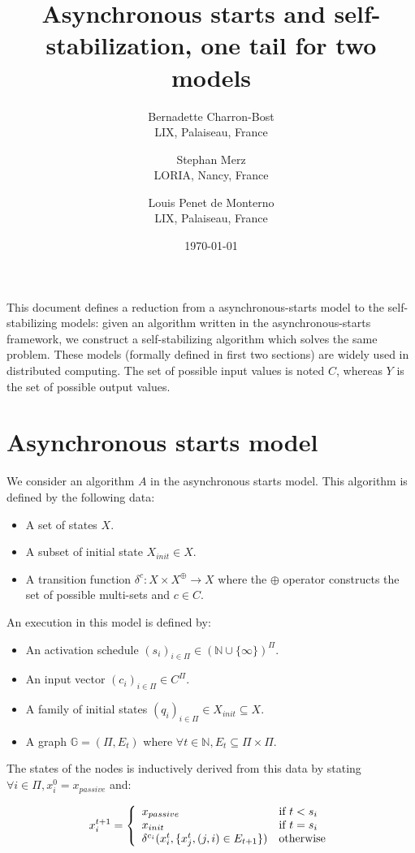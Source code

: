 \documentclass[11pt,letterpaper]{article}
\title{Asynchronous starts and self-stabilization, one tail for two models}
\author{
	Bernadette Charron-Bost \\
	LIX, Palaiseau, France
\and
	Stephan Merz \\
	LORIA, Nancy, France
\and
	Louis Penet de Monterno \\
	LIX, Palaiseau, France
}
\date{\today}
\begin{document}
  \maketitle

This document defines a reduction from a asynchronous-starts model to the self-stabilizing models:
given an algorithm written in the asynchronous-starts framework, we construct a self-stabilizing algorithm which solves the same problem.
These models (formally defined in first two sections) are widely used in distributed computing.
The set of possible input values is noted $C$, whereas $Y$ is the set of possible output values.

\section{Asynchronous starts model}

We consider an algorithm $A$ in the asynchronous starts model.
This algorithm is defined by the following data:

\begin{itemize}
	\item A set of states $X$.
	\item A subset of initial state $X_{init} \in X$.
	\item A transition function $\delta^c : X \times X^\oplus \rightarrow X$ where the $\oplus$ operator constructs the set of possible multi-sets and $c \in C$.
\end{itemize}

\noindent An execution in this model is defined by:
\begin{itemize}
	\item An activation schedule $(s_i)_{i \in \Pi} \in (\mathds{N} \cup \{\infty\})^\Pi$.
	\item An input vector $(c_i)_{i \in \Pi} \in C^\Pi$.
	\item A family of initial states $(q_i)_{i \in \Pi} \in X_{init} \subseteq X$.
	\item A graph $\mathds{G} = (\Pi, E_t)$ where $\forall t \in \mathds{N}, E_t \subseteq \Pi \times \Pi$.
\end{itemize}

\noindent The states of the nodes is inductively derived from this data by stating $\forall i \in \Pi, x_i^0 = x_{passive}$ and:

$$x_i^{t+1} = \left \{ \begin{array}{l l} x_{passive} & \mbox{if}~t < s_i \\
	x_{init} & \mbox{if}~t = s_i \\
\delta^{c_i}(x_i^t, \{x_j^t, (j,i) \in E_{t+1}\}) & \mbox{otherwise} \end{array} \right.$$
\end{document}
